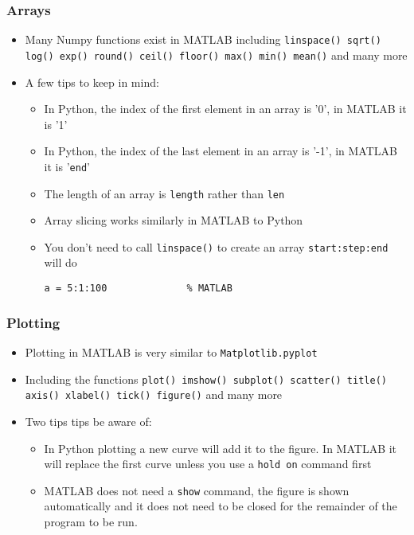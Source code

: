 \documentclass[english,14pt]{beamer}
\begin{document}
\begin{frame}[fragile]

\frametitle{Arrays}

\begin{itemize}
	\item Many Numpy functions exist in MATLAB including \texttt{linspace() sqrt() log() exp() round() ceil() floor() max() min() mean()} and many more
	\item A few tips to keep in mind:
	\begin{itemize}
		\item In Python, the index of the first element in an array is '0', in MATLAB it is '1'
		\item In Python, the index of the last element in an array is '-1', in MATLAB it is '\texttt{end}'
		\item The length of an array is \texttt{length} rather than \texttt{len}
		\item Array slicing works similarly in MATLAB to Python
            \item You don't need to call \texttt{linspace()} to create an array \texttt{start:step:end} will do
\begin{lstlisting}[style=MStyle]
a = 5:1:100              % MATLAB
\end{lstlisting}
	\end{itemize}
\end{itemize}
\end{frame}


\begin{frame}[fragile]

\frametitle{Plotting}

\begin{itemize}       
	\item Plotting in MATLAB is very similar to \texttt{Matplotlib.pyplot}
	\item Including the functions \texttt{plot() imshow() subplot() scatter() title() axis() xlabel() tick() figure()} and many more
	\item Two tips tips be aware of:
	\begin{itemize}
		\item In Python plotting a new curve will add it to the figure. In MATLAB it will replace the first curve unless you use a \texttt{hold on} command first
		\item MATLAB does not need a \texttt{show} command, the figure is shown automatically and it does not need to be closed for the remainder of the program to be run.
    \end{itemize}
\end{itemize}
\end{frame}
\end{document}
